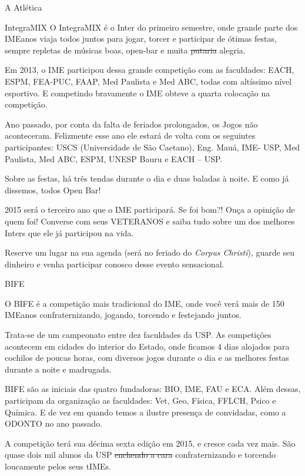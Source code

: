 \begin{secao}{A Atlética}
\begin{subsecao}{IntegraMIX}
O IntegraMIX é o Inter do primeiro semestre, onde grande parte dos IMEanos
viaja todos juntos para jogar, torcer e participar de ótimas festas, sempre
repletas de músicas boas, open-bar e muita \sout{putaria} alegria.

Em 2013, o IME participou dessa grande competição com as faculdades:
EACH, ESPM, FEA-PUC, FAAP, Med Paulista e Med ABC, todas com altíssimo nível
esportivo. E competindo bravamente o IME obteve a quarta colocação na
competição.

Ano passado, por conta da falta de feriados prolongados, os Jogos não aconteceram.
Felizmente esse ano ele estará de volta com os seguintes participantes:
USCS (Universidade de São Caetano), Eng. Mauá, IME- USP,  Med Paulista,
Med ABC, ESPM, UNESP Bauru e EACH – USP.

Sobre as festas, há três tendas durante o dia e duas baladas à noite.
E como já dissemos, todos Open Bar!

2015 será o terceiro ano que o IME participará. Se foi bom?! Ouça a opinição de 
quem foi! Converse com seus VETERANOS e saiba tudo sobre um dos melhores Inters
que ele já participou na vida.

Reserve um lugar na sua agenda (será no feriado do \textit{Corpus Christi}),
guarde seu dinheiro e venha participar conosco desse evento sensacional.


\end{subsecao}
\begin{subsecao}{BIFE}

O BIFE é a competição mais tradicional do IME, onde você verá mais de 150
IMEanos confraternizando, jogando, torcendo e festejando juntos.

Trata-se de um campeonato entre dez faculdades da USP. As competições acontecem em cidades do interior do Estado, onde ficamos 4 dias
alojados para cochilos de poucas horas, com diversos jogos durante o dia e as
melhores festas durante a noite e madrugada.

BIFE são as iniciais das quatro fundadoras: BIO, IME, FAU e ECA.
Além dessas, participam da organização as faculdades: Vet, Geo, Física, FFLCH,
Psico e Química. E de vez em quando temos a ilustre presença de convidadas, como
a ODONTO no ano passado. %

A competição terá sua décima sexta edição em 2015, e cresce cada vez mais. %
São quase dois mil alunos da USP \sout{enchendo a cara} confraternizando e
torcendo loucamente pelos seus tIMEs.


\end{subsecao}
\end{secao}
